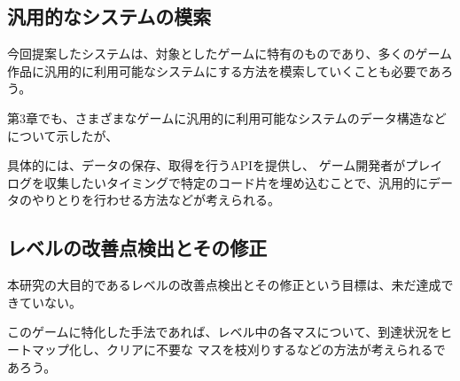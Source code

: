 \subsection{汎用的なシステムの模索}
今回提案したシステムは、対象としたゲームに特有のものであり、多くのゲーム作品に汎用的に利用可能なシステムにする方法を模索していくことも必要であろう。

第3章でも、さまざまなゲームに汎用的に利用可能なシステムのデータ構造などについて示したが、


具体的には、データの保存、取得を行うAPIを提供し、
ゲーム開発者がプレイログを収集したいタイミングで特定のコード片を埋め込むことで、汎用的にデータのやりとりを行わせる方法などが考えられる。

\subsection{レベルの改善点検出とその修正}
本研究の大目的であるレベルの改善点検出とその修正という目標は、未だ達成できていない。

このゲームに特化した手法であれば、レベル中の各マスについて、到達状況をヒートマップ化し、クリアに不要な
マスを枝刈りするなどの方法が考えられるであろう。

